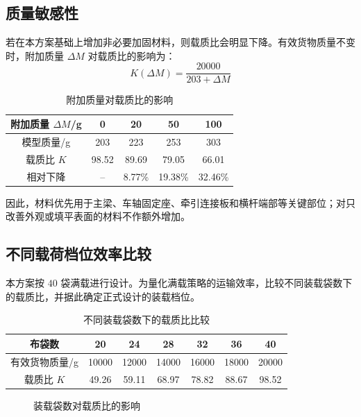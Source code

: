 \documentclass[UTF8,a4paper,12pt,fontset=none]{ctexart}
\numberwithin{equation}{section}
\numberwithin{figure}{section}
\numberwithin{table}{section}
\begin{document}
\subsection{质量敏感性}
若在本方案基础上增加非必要加固材料，则载质比会明显下降。有效货物质量不变时，附加质量 $\Delta M$ 对载质比的影响为：
\begin{equation}
  K(\Delta M)=\frac{20000}{203+\Delta M}
\end{equation}

\begin{table}[H]
\centering
\caption{附加质量对载质比的影响}
\label{tab:mass-sensitivity}
\begin{tabular}{c c c c c}
\toprule
\textbf{附加质量 $\Delta M$}/g & \textbf{0} & \textbf{20} & \textbf{50} & \textbf{100} \\\midrule
模型质量/g & 203 & 223 & 253 & 303 \\
载质比 $K$ & 98.52 & 89.69 & 79.05 & 66.01 \\
相对下降 & -- & 8.77\% & 19.38\% & 32.46\% \\
\bottomrule
\end{tabular}
\end{table}

因此，材料优先用于主梁、车轴固定座、牵引连接板和横杆端部等关键部位；对只改善外观或填平表面的材料不作额外增加。

\subsection{不同载荷档位效率比较}
本方案按 $40$ 袋满载进行设计。为量化满载策略的运输效率，比较不同装载袋数下的载质比，并据此确定正式设计的装载档位。

\begin{table}[H]
\centering
\caption{不同装载袋数下的载质比比较}
\label{tab:bag-efficiency}
\begin{tabular}{c c c c c c c}
\toprule
\textbf{布袋数} & \textbf{20} & \textbf{24} & \textbf{28} & \textbf{32} & \textbf{36} & \textbf{40} \\\midrule
有效货物质量/g & 10000 & 12000 & 14000 & 16000 & 18000 & 20000 \\
载质比 $K$ & 49.26 & 59.11 & 68.97 & 78.82 & 88.67 & 98.52 \\
\bottomrule
\end{tabular}
\end{table}

\begin{figure}[H]
\centering
{}
\caption{装载袋数对载质比的影响}
\label{fig:bag-efficiency}
\end{figure}
\end{document}
